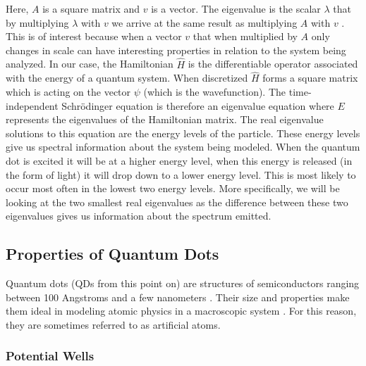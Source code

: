 \documentclass[authoryearcitations]{UoYCSproject}
\begin{document}
Here, $A$ is a square matrix and $v$ is a vector. The eigenvalue is the scalar $\lambda$ that by multiplying 
$\lambda$ with $v$ we arrive at the same result as multiplying $A$ with $v$ \cite{Hamming}. This is of interest
because when a vector $v$ that when multiplied by $A$ only changes in scale can have interesting properties in relation
to the system being analyzed. In our case, the Hamiltonian $\hat{H}$ is the differentiable operator associated with 
the energy of a quantum system. When discretized $\hat{H}$ forms a square matrix which is acting on the vector $\psi$
(which is the wavefunction). The time-independent Schr\"{o}dinger equation is therefore an eigenvalue equation where
$E$ represents the eigenvalues of the Hamiltonian matrix.  
The real eigenvalue solutions to this equation are the energy levels
of the particle. These energy levels give us spectral information about the system being modeled. When the quantum 
dot is excited it will be at a higher energy level, when this energy is released (in the form of light) it will drop 
down to a lower energy level. This is most likely to occur most often in the lowest two energy levels. More specifically,
we will be looking at the two smallest real eigenvalues as the difference between these two
eigenvalues gives us information about the spectrum emitted. 




\subsection{Properties of Quantum Dots}
Quantum dots (QDs from this point on) are structures of semiconductors ranging between 100 Angstroms and 
a few nanometers \cite{dots}. Their size and properties make them ideal in modeling atomic physics in a
macroscopic system \cite{Li}. For this reason, they are sometimes referred to as artificial atoms.

\subsubsection{Potential Wells}
\label{potentialWells}
\end{document}
